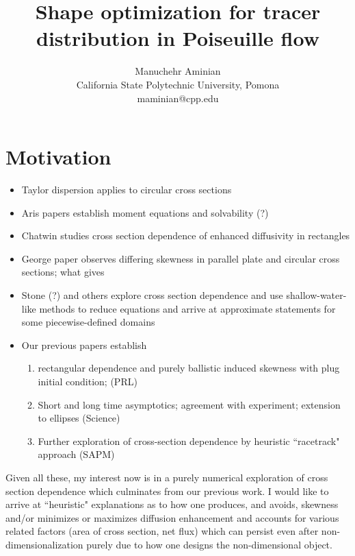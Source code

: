 \documentclass{amsart}
\title{Shape optimization for tracer distribution in Poiseuille flow}
\author{Manuchehr Aminian \\
California State Polytechnic University, Pomona \\ {maminian@cpp.edu}}
\begin{document}
\maketitle

\section{Motivation}
\begin{itemize}
\item Taylor dispersion applies to circular cross sections
\item Aris papers establish moment equations and solvability (?)
\item Chatwin studies cross section dependence of enhanced diffusivity 
in rectangles
\item George paper observes differing skewness in parallel plate 
and circular cross sections; what gives
\item Stone (?) and others explore cross section dependence and 
use shallow-water-like methods to reduce equations and arrive 
at approximate statements for some piecewise-defined domains
\item Our previous papers establish 
\begin{enumerate}
\item rectangular dependence and 
purely ballistic induced skewness with plug initial condition; (PRL)
\item Short and long time asymptotics; agreement with experiment; 
extension to ellipses (Science)
\item Further exploration of cross-section dependence by heuristic 
``racetrack" approach (SAPM)
\end{enumerate}
\end{itemize}

Given all these, my interest now is in a purely numerical exploration 
of cross section dependence which culminates from our previous work. 
I would like to arrive at ``heuristic" explanations as to how one 
produces, and avoids, skewness and/or minimizes or maximizes 
diffusion enhancement and accounts for various related factors 
(area of cross section, net flux) which can persist even after 
non-dimensionalization purely due to how one designs the non-dimensional 
object.
\end{document}
